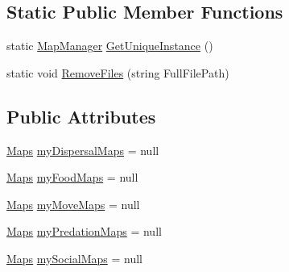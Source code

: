 \subsection*{Static Public Member Functions}
\begin{DoxyCompactItemize}
\item 
static \hyperlink{class_s_e_a_r_c_h_1_1_map_manager}{Map\-Manager} \hyperlink{class_s_e_a_r_c_h_1_1_map_manager_a86848a933398965d1fe78d3716bd9f7a}{Get\-Unique\-Instance} ()
\item 
static void \hyperlink{class_s_e_a_r_c_h_1_1_map_manager_a41bee28adf5c18276dd93968771b8500}{Remove\-Files} (string Full\-File\-Path)
\end{DoxyCompactItemize}
\subsection*{Public Attributes}
\begin{DoxyCompactItemize}
\item 
\hyperlink{class_s_e_a_r_c_h_1_1_maps}{Maps} \hyperlink{class_s_e_a_r_c_h_1_1_map_manager_ad20148421287bbe821110b7940849684}{my\-Dispersal\-Maps} = null
\item 
\hyperlink{class_s_e_a_r_c_h_1_1_maps}{Maps} \hyperlink{class_s_e_a_r_c_h_1_1_map_manager_ae3f24b4564a33fa52ec40c522a7e959d}{my\-Food\-Maps} = null
\item 
\hyperlink{class_s_e_a_r_c_h_1_1_maps}{Maps} \hyperlink{class_s_e_a_r_c_h_1_1_map_manager_a0aa2e352304a687c5fca3f5baf619c31}{my\-Move\-Maps} = null
\item 
\hyperlink{class_s_e_a_r_c_h_1_1_maps}{Maps} \hyperlink{class_s_e_a_r_c_h_1_1_map_manager_a465ce249c2c602477c57de819b045eb8}{my\-Predation\-Maps} = null
\item 
\hyperlink{class_s_e_a_r_c_h_1_1_maps}{Maps} \hyperlink{class_s_e_a_r_c_h_1_1_map_manager_ab396ee0ec4d6090d467b8c3bc99f6d46}{my\-Social\-Maps} = null
\end{DoxyCompactItemize}
